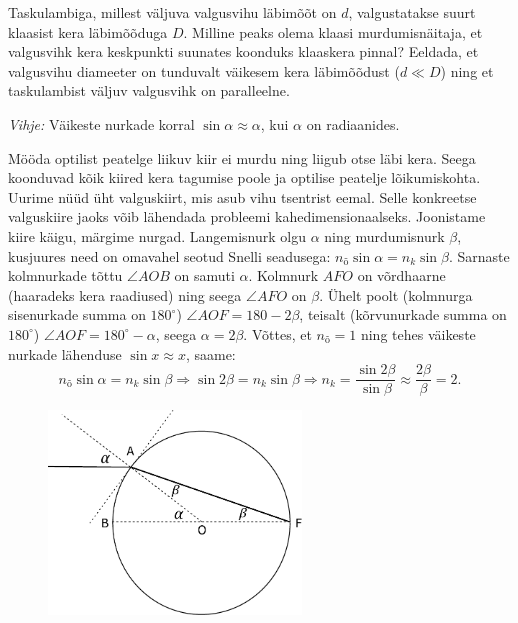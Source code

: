 \setAuthor{}

Taskulambiga, millest väljuva valgusvihu läbimõõt on $d$, valgustatakse suurt
klaasist kera läbimõõduga $D$. Milline peaks olema klaasi murdumisnäitaja, et
valgusvihk kera keskpunkti suunates koonduks klaaskera pinnal? Eeldada, et
valgusvihu diameeter on tunduvalt väikesem kera läbimõõdust ($d\ll D$) ning et
taskulambist väljuv valgusvihk on paralleelne.

\emph{Vihje:} Väikeste nurkade korral $\sin \alpha \approx \alpha$, kui $\alpha$
on radiaanides.


\hint

\solu
Mööda optilist peatelge liikuv kiir ei murdu ning liigub otse läbi kera. Seega koonduvad kõik kiired kera tagumise poole ja optilise peatelje lõikumiskohta. Uurime nüüd üht valguskiirt, mis asub vihu tsentrist eemal. Selle konkreetse valguskiire jaoks võib lähendada probleemi kahedimensionaalseks. Joonistame kiire käigu, märgime nurgad. Langemisnurk olgu $\alpha$ ning murdumisnurk $\beta$, kusjuures need on omavahel seotud Snelli seadusega: $n_{õ}\sin\alpha=n_{k}\sin\beta$. Sarnaste kolmnurkade tõttu $\angle AOB$ on samuti $\alpha$. Kolmnurk $AFO$ on võrdhaarne (haaradeks kera raadiused) ning seega $\angle AFO$ on $\beta$. Ühelt poolt (kolmnurga sisenurkade summa on $180^\circ$) $\angle AOF=180-2\beta$, teisalt (kõrvunurkade summa on $180^\circ$) $\angle AOF=180^\circ-\alpha$, seega $\alpha=2\beta$. Võttes, et $n_{õ}=1$ ning tehes väikeste nurkade lähenduse $\sin x \approx x$, saame:
$$n_{õ}\sin\alpha=n_{k}\sin\beta \Rightarrow \sin2\beta=n_{k}\sin\beta \Rightarrow n_k = \frac{\sin2\beta}{\sin\beta}\approx\frac{2\beta}{\beta}=2.$$
\begin{figure}[htbp!]
\centering
\includegraphics[width=0.6\textwidth]{2020-v3g-01-sol.pdf}
\end{figure}
\probend